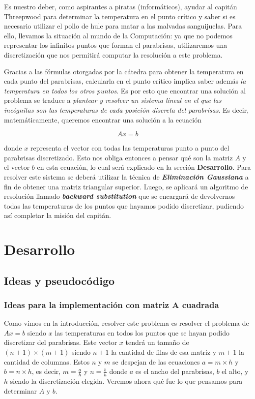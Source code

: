 \vspace{\baselineskip}
\par 
Es nuestro deber, como aspirantes a piratas (informáticos), ayudar al capitán Threepwood para determinar la temperatura en el punto crítico y saber si es necesario utilizar el pollo de hule para matar a las malvadas sanguijuelas. Para ello, llevamos la situación al mundo de la Computación: ya que no podemos representar los infinitos puntos que forman el parabrisas, utilizaremos una discretización que nos permitirá computar la resolución a este problema. 
\par
Gracias a las fórmulas otorgadas por la cátedra para obtener la temperatura en cada punto del parabrisas, calcularla en el punto crítico implica saber además \textit{la temperatura en todos los otros puntos}. Es por esto que encontrar una solución al problema se traduce a \textit{plantear y resolver un sistema lineal en el que las incógnitas son las temperaturas de cada posición discreta del parabrisas}. Es decir, matemáticamente, queremos encontrar una solución a la ecuación

\[ Ax = b \]

donde $x$ representa el vector con todas las temperaturas punto a punto del parabrisas discretizado. Esto nos obliga entonces a pensar qué son la matriz $A$ y el vector $b$ en esta ecuación, lo cual será explicado en la sección \textbf{Desarrollo}. Para resolver este sistema se deberá utilizar la técnica de \textbf{\textit{Eliminación Gaussiana}} a fin de obtener una matriz triangular superior. Luego, se aplicará un algoritmo de resolución llamado \textbf{\textit{backward substitution}} que se encargará de devolvernos todas las temperaturas de los puntos que hayamos podido discretizar, pudiendo así completar la misión del capitán.

\section{Desarrollo}

\subsection{Ideas y pseudocódigo}

\subsubsection{Ideas para la implementación con matriz A cuadrada}

Como vimos en la introducción, resolver este problema es resolver el problema de $Ax = b$ siendo $x$ las temperaturas en todos los puntos que se hayan podido discretizar del parabrisas. Este vector $x$ tendrá un tamaño de $(n+1) \times (m+1)$ siendo $n+1$ la cantidad de filas de esa matriz y $m+1$ la cantidad de columnas. Estos $n$ y $m$ se despejan de las ecuaciones $a = m \times h$ y $b = n \times h$, es decir, $m = \frac{a}{h}$ y $n = \frac{b}{h}$ donde $a$ es el ancho del parabrisas, $b$ el alto, y $h$ siendo la discretización elegida. Veremos ahora qué fue lo que pensamos para determinar $A$ y $b$.

